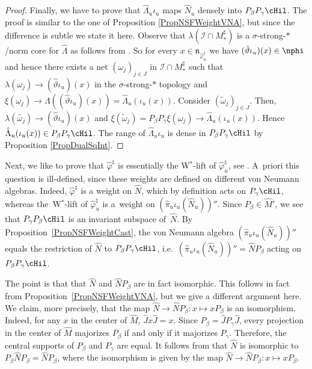 \begin{proof}
Finally, we have to prove that $\hat{\Lambda}_u \iota_u$ maps $\hat{N}_u$ densely into $P_\beta P_\gamma \cHil$. The proof is similar to the one of Proposition \ref{PropNSFWeightVNA}, but since the dif\/ference is subtle we state it here. Observe that $\lambda(\mathcal{I} \cap M^\sharp_\ast)$ is a $\sigma$-strong-$\ast$/norm core for $\hat{\Lambda}$ as follows from \cite[Proposition 2.6]{KusVaeII}. So for every $x \in \mathfrak{n}_{\hat{\varphi}^\natural_u}$ we have $(\hat{\vartheta}\iota_u)(x) \in \nphi$ and hence there exists a net $(\omega_j)_{j \in J}$ in $\mathcal{I} \cap M^\sharp_\ast$ such that $\lambda(\omega_j) \rightarrow (\hat{\vartheta}\iota_u)(x)$ in the $\sigma$-strong-$\ast$ topology and $\xi(\omega_j) \rightarrow \Lambda ((\hat{\vartheta}\iota_u) (x)) = \hat{\Lambda}_u(\iota_u(x))$.  Consider $(\tilde{\omega}_j)_{j \in J}$. Then, $\lambda(\tilde{\omega_j}) \rightarrow (\hat{\vartheta}\iota_u)(x)$ and $\xi(\tilde{\omega}_j) = P_\beta P_\gamma \xi(\omega_j) \rightarrow \hat{\Lambda}_u(\iota_u(x)) $. Hence $\hat{\Lambda}_u(\iota_u(x)) \in P_\beta P_\gamma \cHil$. The range of $\hat{\Lambda}_u \iota_u$ is dense in $P_\beta P_\gamma \cHil$ by Proposition \ref{PropDualSqInt}.
\end{proof}


Next, we like to prove that $\hat{\varphi}^\natural$ is essentially the W$^\ast$-lift of $\hat{\varphi}_u^\natural$, see \cite[Def\/inition~1.31]{KusVae}. A~priori this question is ill-def\/ined, since these weights are def\/ined on dif\/ferent von Neumann algebras. Indeed, $\hat{\varphi}^\natural$ is a weight on $\hat{N}$, which by def\/inition acts on $P_\gamma \cHil$, whereas the~W$^\ast$-lift of $\hat{\varphi}_u^\natural$ is a~weight on $(\hat{\pi}_u\iota_u(\hat{N}_u)) ''$.
Since $P_\beta \in \hat{M}'$, we see that $P_\gamma P_\beta \cHil$ is an invariant subspace of~$\hat{N}$. By Proposition~\ref{PropNSFWeightCast}, the   von Neumann algebra  $(\hat{\pi}_u\iota_u(\hat{N}_u)) ''$ equals the restriction of $\hat{N}$ to $P_\beta P_\gamma \cHil$, i.e.\ $(\hat{\pi}_u\iota_u(\hat{N}_u)) '' = \hat{N} P_\beta$ acting on $P_\beta P_\gamma \cHil$.

The point is that  that $\hat{N}$ and $\hat{N} P_\beta $ are in fact isomorphic. This follows in fact from Proposition~\ref{PropNSFWeightVNA}, but we give a dif\/ferent argument here. We claim, more precisely, that the map $\hat{N} \rightarrow \hat{N} P_\beta: x \mapsto x P_\beta$ is an isomorphism.
 Indeed, for any $x$ in the center of $\hat{M}$, $\hat{J} x \hat{J} = x$. Since $P_\beta = \hat{J} P_\gamma \hat{J}$, every projection in the center of $\hat{M}$  majorizes $P_\beta$ if and only if it majorizes $P_\gamma$. Therefore, the central supports of $P_\beta$ and $P_\gamma$ are equal. It follows from \cite[Theorem~10.3.3]{KadRin} that $\hat{N}$ is isomorphic to $P_\beta \hat{N} P_\beta = \hat{N} P_\beta$, where the isomorphism is given by the map $\hat{N} \rightarrow \hat{N} P_\beta: x \mapsto x P_\beta$.

